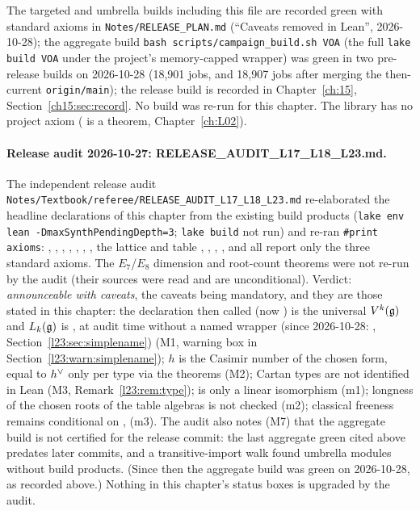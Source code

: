The targeted and umbrella builds including this file are recorded green with standard axioms in \texttt{Notes/RELEASE\_PLAN.md}
(``Caveats removed in Lean'', 2026-10-28); the aggregate build \texttt{bash scripts/campaign\_build.sh VOA} (the full \texttt{lake build VOA} under the project's memory-capped wrapper) was green in two pre-release builds on 2026-10-28 (18{,}901 jobs, and 18{,}907 jobs after merging the then-current
\texttt{origin/main}); the release build is recorded in Chapter~\ref{ch:15}, Section~\ref{ch15:sec:record}. No build was re-run
for this chapter.
The library has no project axiom ( is a theorem, Chapter~\ref{ch:L02}).

\paragraph{Release audit 2026-10-27: RELEASE\_AUDIT\_L17\_L18\_L23.md.} The independent release audit
\texttt{Notes/\allowbreak Textbook/\allowbreak referee/\allowbreak RELEASE\_AUDIT\_L17\_L18\_L23.md} re-elaborated the headline
declarations of this chapter from the existing build products (\texttt{lake env lean -DmaxSynthPendingDepth=3}; \texttt{lake build}
not run) and re-ran \texttt{\#print axioms}: , ,
, , , ,
, the lattice and table , , ,
,  and  all report only the three standard
axioms. The $E_7$/$E_8$ dimension and root-count theorems were not re-run by the audit (their sources were read and are
unconditional). Verdict: \emph{announceable with caveats}, the caveats being mandatory, and they are those stated in this chapter:
the declaration then called  (now ) is the universal $V^k(\mathfrak g)$ and $L_k(\mathfrak g)$ is
, at audit time without a named wrapper (since 2026-10-28: ,
Section~\ref{l23:sec:simplename}) (M1, warning box in Section~\ref{l23:warn:simplename}); $h$ is the Casimir number of the chosen form, equal to $h^\vee$ only per type
via the  theorems (M2); Cartan types are not identified in Lean (M3, Remark~\ref{l23:rem:type}); 
is only a linear isomorphism (m1); longness of the chosen roots of the table algebras is not checked (m2); classical freeness remains
conditional on ,  (m3). The audit also notes (M7) that the aggregate build is not certified for the release
commit: the last aggregate green cited above predates later commits, and a transitive-import walk found umbrella modules without build
products. (Since then the aggregate build was green on 2026-10-28, as recorded above.) Nothing in this chapter's status boxes is
upgraded by the audit.

